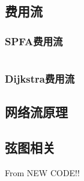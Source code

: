\documentclass[a4paper]{article}
\begin{document}
\begin{multicols}{2}
			\subsection{费用流}
				\subsubsection{SPFA费用流}
					\inputminted{cpp}{../src/graph/SPFA费用流.cpp}

				\subsubsection{Dijkstra费用流}
					

			

			\subsection{网络流原理}
				

			\subsection{弦图相关}
				From NEW CODE!!
				



			




\end{multicols}
\end{document}
